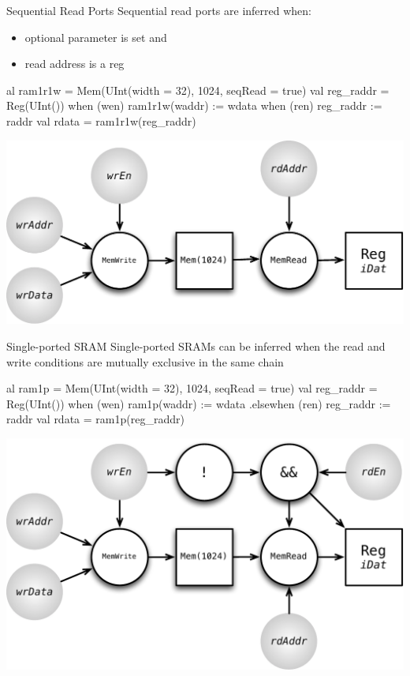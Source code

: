 \documentclass[xcolor=pdflatex,dvipsnames,table]{beamer}
\begin{document}
\begin{frame}[fragile]{Sequential Read Ports}
Sequential read ports are inferred when:
\begin{itemize}
\item optional parameter  is set and
\item read address is a reg
\end{itemize}

\begin{scala}
al ram1r1w =
  Mem(UInt(width = 32), 1024, seqRead = true)
val reg_raddr = Reg(UInt())
when (wen) { ram1r1w(waddr) := wdata }
when (ren) { reg_raddr := raddr }
val rdata = ram1r1w(reg_raddr)
\end{scala}

\begin{center}
\includegraphics[height=0.4\textheight]{figs/mem-seq-read.pdf} 
\end{center}

\end{frame}

\begin{frame}[fragile]{Single-ported SRAM}
Single-ported SRAMs can be inferred when the read and write conditions are
mutually exclusive in the same  chain

\begin{scala}
al ram1p =
  Mem(UInt(width = 32), 1024, seqRead = true)
val reg_raddr = Reg(UInt())
when (wen) { ram1p(waddr) := wdata }
.elsewhen (ren) { reg_raddr := raddr }
val rdata = ram1p(reg_raddr)
\end{scala}

\begin{center}
\includegraphics[height=0.5\textheight]{figs/mem-single-ported.pdf} 
\end{center}

\end{frame}
\end{document}
